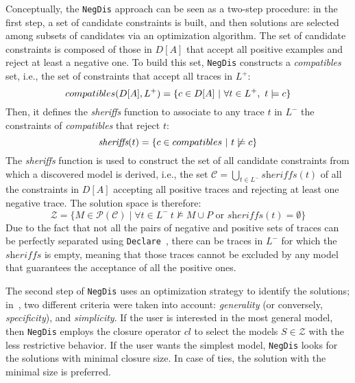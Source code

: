 \documentclass[letterpaper]{article} %
\theoremstyle{definition}
\newcommand{\nd}{\texttt{NegDis}\xspace}
\newcommand{\declare}{\texttt{Declare}\xspace}
\newcommand{\sheriff}{sheriffs}
\begin{document}
Conceptually, the \nd approach can be seen as a two-step procedure: in the first step, a set of candidate constraints is built, and then solutions are selected among subsets of candidates via an optimization algorithm.
%
The set of candidate constraints is composed of %
those in $D[A]$ that accept all positive examples and reject at least a negative one. To build this set, \nd constructs a \emph{compatibles} set, i.e., the set of constraints that accept all traces in $L^+$: 
\begin{equation}
{compatibles(D[A], L^+)} = \{c\in D[A]~|~\forall t\in L^+,~ t\models c \} \\
\end{equation}
%
Then, it defines the \textit{\sheriff} function to associate to any trace $t$ in $L^-$ the constraints of \textit{compatibles} that reject %
$t$:
\begin{equation}
{\textit{\sheriff}}(t) = \{c\in {compatibles}~|~t\not\models c\} \\
\label{eq:sheriffs}
\end{equation}
%
The \textit{\sheriff} function is used to construct the set of all candidate constraints from which a discovered model is derived, i.e., the set $\mathcal{C} = \bigcup_{t\in L^-} \textit{\sheriff}(t)$ of all the constraints in $D[A]$ accepting all positive traces and rejecting at least one negative trace. The solution space is therefore:
\begin{equation}
  \mathcal{Z}=\{M\in\mathcal{P}(\mathcal{C})\mid \forall t\in L^-~t\not\models M\cup P \text{ or } {\textit{\sheriff}}(t) = \emptyset \}
\end{equation}
Due to the fact that not all the pairs of negative and positive sets of traces can be perfectly separated using \declare~\cite{DBLP:conf/bpm/SlaatsDB21}, there can be traces in $L^-$ for which the ${\textit{\sheriff}}$ is empty, meaning that those traces cannot be excluded by any model that guarantees the acceptance of all the positive ones.

The second step of \nd uses an optimization strategy to identify the solutions; in~\cite{deviant-tkde}, two different criteria were taken into account: \emph{generality} (or conversely, \emph{specificity}), and \emph{simplicity}.
If the user is interested in the most general model, then \nd employs the closure operator $cl$ to select the models $S \in \mathcal{Z}$ with the less restrictive behavior.
If the user wants the simplest model, \nd looks for the solutions with minimal closure size. In case of ties, the solution with the minimal size is preferred.
\end{document}
